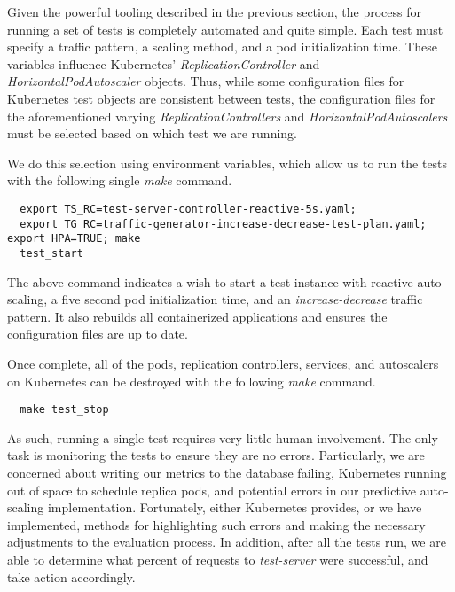 Given the powerful tooling described in the previous section, the process for
running a set of tests is completely automated and quite simple. Each test
must specify a traffic pattern, a scaling method, and a pod initialization time.
These variables influence Kubernetes' \textit{ReplicationController} and
\textit{HorizontalPodAutoscaler} objects. Thus, while some configuration files
for Kubernetes test objects are consistent between tests, the configuration
files for the aforementioned varying \textit{ReplicationControllers} and
\textit{HorizontalPodAutoscalers} must be selected based on which test we are
running.

We do this selection using environment variables, which allow us to run the
tests with the following single \textit{make} command.

\begin{verbatim}
  export TS_RC=test-server-controller-reactive-5s.yaml;
  export TG_RC=traffic-generator-increase-decrease-test-plan.yaml; export HPA=TRUE; make
  test_start
\end{verbatim}

The above command indicates a wish to start a test instance with reactive
auto-scaling, a five second pod initialization time, and an
\textit{increase-decrease} traffic pattern. It also rebuilds all containerized
applications and ensures the configuration files are up to date.

Once complete, all of the pods, replication controllers, services, and
autoscalers on Kubernetes can be destroyed with the following \textit{make}
command.

\begin{verbatim}
  make test_stop
\end{verbatim}

As such, running a single test requires very little human involvement. The only
task is monitoring the tests to ensure they are no errors. Particularly, we are
concerned about writing our metrics to the database failing, Kubernetes
running out of space to schedule replica pods, and potential errors in our
predictive auto-scaling implementation. Fortunately, either Kubernetes provides,
or we have implemented, methods for highlighting such errors and making the
necessary adjustments to the evaluation process. In addition, after all the
tests run, we are able to determine what percent of requests to
\textit{test-server} were successful, and take action accordingly.
